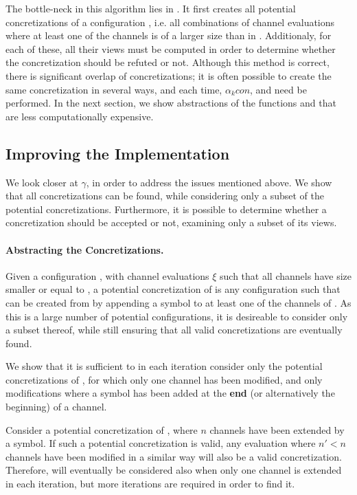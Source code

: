 The bottle-neck in this algorithm lies in . It first creates all potential concretizations of a configuration , i.e. all combinations of channel evaluations where at least one of the channels is of a larger size than in . Additionaly, for each of these, all their views must be computed in order to determine whether the concretization should be refuted or not. Although this method is correct, there is significant overlap of concretizations; it is often possible to create the same concretization  in several ways, and each time, $\alpha_k{con}$,  and  need be performed. In the next section, we show abstractions of the functions  and  that are less computationally expensive.


\subsection{Improving the Implementation}
We look closer at $\gamma$, in order to address the issues mentioned above. We show that all concretizations can be found, while considering only a subset of the potential concretizations. Furthermore, it is possible to determine whether a concretization should be accepted or not, examining only a subset of its views. 

\paragraph{Abstracting the Concretizations.}
Given a configuration , with channel evaluations $\xi$ such that all channels have size smaller or equal to , a potential concretization of  is any configuration  such that  can be created from  by appending a symbol to at least one of the channels of . As this is a large number of potential configurations, it is desireable to consider only a subset thereof, while still ensuring that all valid concretizations are eventually found.

We show that it is sufficient to in each iteration consider only the potential concretizations of , for which only one channel has been modified, and only modifications where a symbol has been added at the \textbf{end} (or alternatively the beginning) of a channel.

Consider a potential concretization  of , where $n$ channels have been extended by a symbol. If such a potential concretization is valid, any evaluation where $n'<n$ channels have been modified in a similar way will also be a valid concretization. Therefore,  will eventually be considered also when only one channel is extended in each iteration, but more iterations are required in order to find it.

